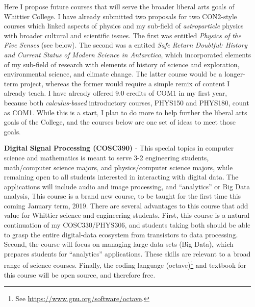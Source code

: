 \documentclass[../../main.tex]{subfiles}
\begin{document}
\label{sec:future}

Here I propose future courses that will serve the broader liberal arts goals of Whittier College.  I have already submitted two proposals for two CON2-style courses which linked aspects of physics and my sub-field of \textit{astroparticle} physics with broader cultural and scientific issues.  The first was entitled \textit{Physics of the Five Senses} (see below).  The second was a entited \textit{Safe Return Doubtful: History and Current Status of Modern Science in Antarctica}, which incorporated elements of my sub-field of research with elements of history of science and exploration, environmental science, and climate change.  The latter course would be a longer-term project, whereas the former would require a simple remix of content I already teach.  I have already offered 9.0 credits of COM1 in my first year, because both \textit{calculus-based} introductory courses, PHYS150 and PHYS180, count as COM1.  While this is a start, I plan to do more to help further the liberal arts goals of the College, and the courses below are one set of ideas to meet those goals.  \\ \hspace{0.1cm}

\textbf{Digital Signal Processing (COSC390)} - This special topics in computer science and mathematics is meant to serve 3-2 engineering students, math/computer science majors, and physics/computer science majors, while remaining open to all students interested in interacting with digital data.  The applications will include audio and image processing, and ``analytics'' or Big Data analysis,  This course is a brand new course, to be taught for the first time this coming January term, 2019. There are several advantages to this course that add value for Whittier science and engineering students.  First, this course is a natural continuation of my COSC330/PHYS306, and students taking both should be able to grasp the entire digital-data ecosystem from transistors to data processing.  Second, the course will focus on managing large data sets (Big Data), which prepares students for ``analytics'' applications.  These skills are relevant to a broad range of science courses.  Finally, the coding language (octave)\footnote{See \url{https://www.gnu.org/software/octave}.} and textbook \cite{dsp} for this course will be open source, and therefore free. \\ \hspace{0.1cm}
\end{document}
